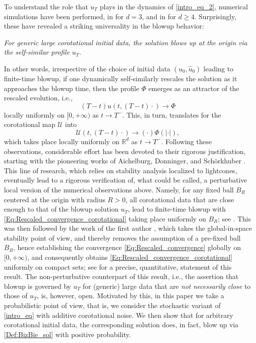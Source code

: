 \documentclass[12pt,reqno]{amsart}
\theoremstyle{plain}
\theoremstyle{remark}
\theoremstyle{plain}
\theoremstyle{definition}
\numberwithin{equation}{section}
\numberwithin{equation}{section}
\def\R{{\mathbb R}}
\begin{document}
	To understand the role that $u_T$ plays in the dynamics of \eqref{intro_eq_2}, numerical simulations have been performed, in \cite{BizChmTab00} for $d =3$, and in \cite{bizon2015generic} for $d \geq 4$. Surprisingly, these have revealed a striking universality in the blowup behavior: 
	\begin{center}
		\emph{For generic large corotational initial data, the solution blows up at the origin via the self-similar profile $u_T$.}
	\end{center}
	In other words, irrespective of the choice of initial data $(u_0,\hat{u}_0)$ leading to finite-time blowup, if one dynamically self-similarly rescales the solution as it approaches the blowup time, then the profile $\Phi$ emerges as an attractor of the rescaled evolution, i.e.,
	\begin{equation}\label{Eq:Rescaled_convergence}
		(T-t)u(t,(T-t)\cdot) \rightarrow \Phi
	\end{equation} 
	locally uniformly on $[0,+\infty)$ as $t \rightarrow T^-.$ This, in turn, translates for the corotational map $\mathcal{U}$ into
	\begin{equation}\label{Eq:Rescaled_convergence_corotational}
		\mathcal{U}(t,(T-t)\cdot) \rightarrow (\cdot)\Phi(|\cdot|),
	\end{equation}
	which takes place locally uniformly on $\R^d$ as $t \rightarrow T^-.$
	Following these observations, considerable effort has been devoted to their rigorous justification, starting with the pioneering works of Aichelburg, Donninger, and Sch\"orkhuber \cite{DonAic09,Don11,DonSchAic12}. This line of research, which relies on stability analysis localized to lightcones, eventually lead to a rigorous verification of, what could be called, a perturbative local version of the numerical observations above. Namely, for any fixed ball $B_R$ centered at the origin with radius $R>0$, all corotational data that are close enough to that of the blowup solution $u_T$, lead to finite-time blowup with \eqref{Eq:Rescaled_convergence_corotational} taking place uniformly on $B_R$; see \cite{CosDonXia16,CosDonGlo17,ChaDonGlo17,BieDonSch21,DonOst24}. This was then followed by the work of the first author \cite{glogic2025globally}, which takes the global-in-space stability point of view, and thereby removes the assumption of a pre-fixed ball $B_R$, hence establishing the convergence \eqref{Eq:Rescaled_convergence} globally on $[0,+\infty)$, and consequently obtains \eqref{Eq:Rescaled_convergence_corotational} uniformly on compact sets; see \cite[Theorem 1.1]{glogic2025globally} for a precise, quantitative, statement of this result. The non-perturbative counterpart of this result, i.e., the assertion that blowup is governed by $u_T$ for (generic) large data that are \emph{not necessarily close} to those of $u_T$, is, however, open. Motivated by this, in this paper we take a probabilistic point of view, that is, we consider the stochastic variant of \eqref{intro_eq} with additive corotational noise. We then show that for arbitrary corotational initial data, the corresponding solution does, in fact, blow up via \eqref{Def:BizBie_sol} with positive probability.
	
\end{document}
